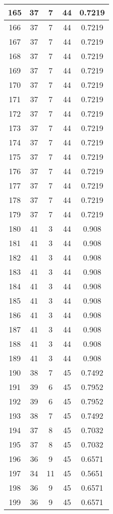 \documentclass[letterpaper, 12pt]{article}
\begin{document}
\begin{longtable}{|c|c|c|c|c|}
165 & 37 & 7 & 44 & 0.7219 \\
\hline
166 & 37 & 7 & 44 & 0.7219 \\
\hline
167 & 37 & 7 & 44 & 0.7219 \\
\hline
168 & 37 & 7 & 44 & 0.7219 \\
\hline
169 & 37 & 7 & 44 & 0.7219 \\
\hline
170 & 37 & 7 & 44 & 0.7219 \\
\hline
171 & 37 & 7 & 44 & 0.7219 \\
\hline
172 & 37 & 7 & 44 & 0.7219 \\
\hline
173 & 37 & 7 & 44 & 0.7219 \\
\hline
174 & 37 & 7 & 44 & 0.7219 \\
\hline
175 & 37 & 7 & 44 & 0.7219 \\
\hline
176 & 37 & 7 & 44 & 0.7219 \\
\hline
177 & 37 & 7 & 44 & 0.7219 \\
\hline
178 & 37 & 7 & 44 & 0.7219 \\
\hline
179 & 37 & 7 & 44 & 0.7219 \\
\hline
180 & 41 & 3 & 44 & 0.908 \\
\hline
181 & 41 & 3 & 44 & 0.908 \\
\hline
182 & 41 & 3 & 44 & 0.908 \\
\hline
183 & 41 & 3 & 44 & 0.908 \\
\hline
184 & 41 & 3 & 44 & 0.908 \\
\hline
185 & 41 & 3 & 44 & 0.908 \\
\hline
186 & 41 & 3 & 44 & 0.908 \\
\hline
187 & 41 & 3 & 44 & 0.908 \\
\hline
188 & 41 & 3 & 44 & 0.908 \\
\hline
189 & 41 & 3 & 44 & 0.908 \\
\hline
190 & 38 & 7 & 45 & 0.7492 \\
\hline
191 & 39 & 6 & 45 & 0.7952 \\
\hline
192 & 39 & 6 & 45 & 0.7952 \\
\hline
193 & 38 & 7 & 45 & 0.7492 \\
\hline
194 & 37 & 8 & 45 & 0.7032 \\
\hline
195 & 37 & 8 & 45 & 0.7032 \\
\hline
196 & 36 & 9 & 45 & 0.6571 \\
\hline
197 & 34 & 11 & 45 & 0.5651 \\
\hline
198 & 36 & 9 & 45 & 0.6571 \\
\hline
199 & 36 & 9 & 45 & 0.6571 \\
\hline
\end{longtable}
\end{document}
